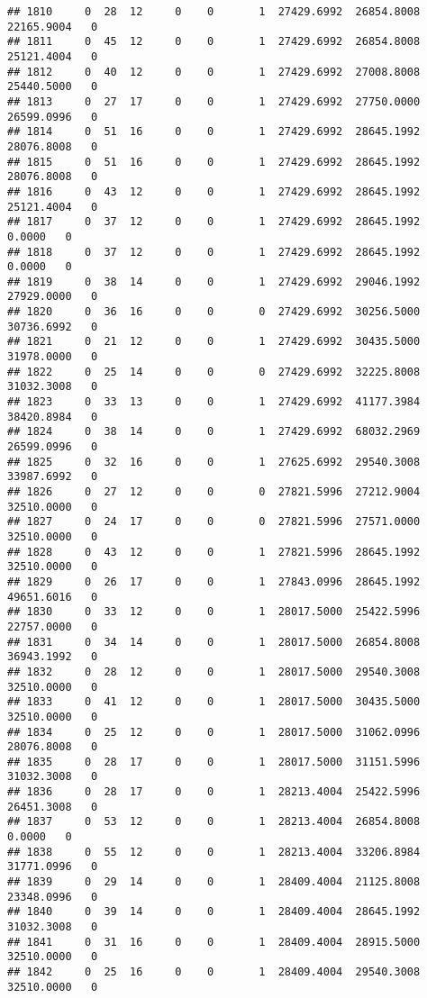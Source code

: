 \documentclass[
]{article}
\begin{document}
\begin{enumerate}
\begin{verbatim}
## 1810     0  28  12     0    0       1  27429.6992  26854.8008  22165.9004   0
## 1811     0  45  12     0    0       1  27429.6992  26854.8008  25121.4004   0
## 1812     0  40  12     0    0       1  27429.6992  27008.8008  25440.5000   0
## 1813     0  27  17     0    0       1  27429.6992  27750.0000  26599.0996   0
## 1814     0  51  16     0    0       1  27429.6992  28645.1992  28076.8008   0
## 1815     0  51  16     0    0       1  27429.6992  28645.1992  28076.8008   0
## 1816     0  43  12     0    0       1  27429.6992  28645.1992  25121.4004   0
## 1817     0  37  12     0    0       1  27429.6992  28645.1992      0.0000   0
## 1818     0  37  12     0    0       1  27429.6992  28645.1992      0.0000   0
## 1819     0  38  14     0    0       1  27429.6992  29046.1992  27929.0000   0
## 1820     0  36  16     0    0       0  27429.6992  30256.5000  30736.6992   0
## 1821     0  21  12     0    0       1  27429.6992  30435.5000  31978.0000   0
## 1822     0  25  14     0    0       0  27429.6992  32225.8008  31032.3008   0
## 1823     0  33  13     0    0       1  27429.6992  41177.3984  38420.8984   0
## 1824     0  38  14     0    0       1  27429.6992  68032.2969  26599.0996   0
## 1825     0  32  16     0    0       1  27625.6992  29540.3008  33987.6992   0
## 1826     0  27  12     0    0       0  27821.5996  27212.9004  32510.0000   0
## 1827     0  24  17     0    0       0  27821.5996  27571.0000  32510.0000   0
## 1828     0  43  12     0    0       1  27821.5996  28645.1992  32510.0000   0
## 1829     0  26  17     0    0       1  27843.0996  28645.1992  49651.6016   0
## 1830     0  33  12     0    0       1  28017.5000  25422.5996  22757.0000   0
## 1831     0  34  14     0    0       1  28017.5000  26854.8008  36943.1992   0
## 1832     0  28  12     0    0       1  28017.5000  29540.3008  32510.0000   0
## 1833     0  41  12     0    0       1  28017.5000  30435.5000  32510.0000   0
## 1834     0  25  12     0    0       1  28017.5000  31062.0996  28076.8008   0
## 1835     0  28  17     0    0       1  28017.5000  31151.5996  31032.3008   0
## 1836     0  28  17     0    0       1  28213.4004  25422.5996  26451.3008   0
## 1837     0  53  12     0    0       1  28213.4004  26854.8008      0.0000   0
## 1838     0  55  12     0    0       1  28213.4004  33206.8984  31771.0996   0
## 1839     0  29  14     0    0       1  28409.4004  21125.8008  23348.0996   0
## 1840     0  39  14     0    0       1  28409.4004  28645.1992  31032.3008   0
## 1841     0  31  16     0    0       1  28409.4004  28915.5000  32510.0000   0
## 1842     0  25  16     0    0       1  28409.4004  29540.3008  32510.0000   0

\end{verbatim}
\end{enumerate}
\end{document}
